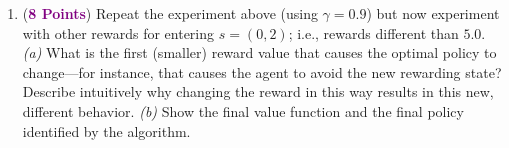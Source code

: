 \documentclass{article}
\newcommand{\POINTS}[1]{\textcolor{purple}{\textbf{{#1}}}}
\begin{document}
\begin{enumerate}
    
    \item (\POINTS{8 Points}) Repeat the experiment above (using $\gamma=0.9$) but now experiment with other rewards for entering $s=(0,2)$; i.e., rewards different than $5.0$. \textit{(a)} What is the first (smaller) reward value that causes the optimal policy to change---for instance, that causes the agent to avoid the new rewarding state? Describe intuitively why changing the reward in this way results in this new, different behavior. \textit{(b)} Show the final value function and the final policy identified by the algorithm.



\end{enumerate}
\end{document}

